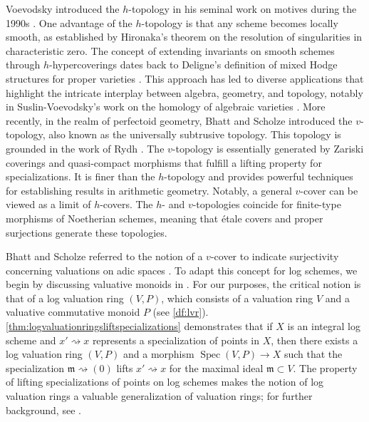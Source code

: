 \documentclass[10pt]{amsart}
\DeclareMathOperator{\Spec}{Spec}
\begin{document}
Voevodsky introduced the $h$-topology in his seminal work on motives during the 1990s \cite{Voevodsky-Homology}. One advantage of the $h$-topology is that any scheme becomes locally smooth, as established by Hironaka's theorem on the resolution of singularities in characteristic zero. The concept of extending invariants on smooth schemes through $h$-hypercoverings dates back to Deligne's definition of mixed Hodge structures for proper varieties \cite{HodgeIII}. This approach has led to diverse applications that highlight the intricate interplay between algebra, geometry, and topology, notably in Suslin-Voevodsky's work on the homology of algebraic varieties \cite{SV}. More recently, in the realm of perfectoid geometry, Bhatt and Scholze \cite{Bhatt-Scholze} introduced the $v$-topology, also known as the universally subtrusive topology. This topology is grounded in the work of Rydh \cite{Rydh}. The $v$-topology is essentially generated by Zariski coverings and quasi-compact morphisms that fulfill a lifting property for specializations. It is finer than the $h$-topology and provides powerful techniques for establishing results in arithmetic geometry. Notably, a general $v$-cover can be viewed as a limit of $h$-covers. The $h$- and $v$-topologies coincide for finite-type morphisms of Noetherian schemes, meaning that étale covers and proper surjections generate these topologies.

Bhatt and Scholze referred to the notion of a $v$-cover to indicate surjectivity concerning valuations on adic spaces \cite[Remark 2.2]{Bhatt-Scholze}. To adapt this concept for log schemes, we begin by discussing valuative monoids in . For our purposes, the critical notion is that of a log valuation ring $(V,P)$, which consists of a valuation ring $V$ and a valuative commutative monoid $P$ (see \cref{df:lvr}). \cref{thm:logvaluationringsliftspecializations} demonstrates that if $X$ is an integral log scheme and $x' \rightsquigarrow x$ represents a specialization of points in $X$, then there exists a log valuation ring $(V,P)$ and a morphism $\Spec{(V,P)} \to X$ such that the specialization $\mathfrak{m} \rightsquigarrow (0)$ lifts $x' \rightsquigarrow x$ for the maximal ideal $\mathfrak{m} \subset V$. The property of lifting specializations of points on log schemes makes the notion of log valuation rings a valuable generalization of valuation rings; for further background, see \cite[Tag 01J8]{stacks-project}.
\vspace{0,1in}
\end{document}
